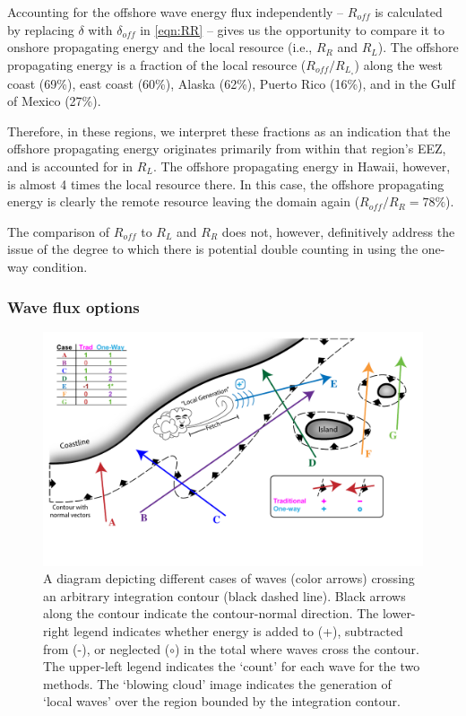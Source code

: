 Accounting for the offshore wave energy flux independently -- $R_{off}$ is calculated by replacing $\delta$ with $\delta_{off}$ in \eqref{eqn:RR} -- gives us the opportunity to compare it to onshore propagating energy and the local resource (i.e., $R_R$ and $R_L$). The offshore propagating energy is a fraction of the local resource ($R_{off} / R_L_\circ$) along the west coast (69\%), east coast (60\%), Alaska (62\%), Puerto Rico (16\%), and in the Gulf of Mexico (27\%). 

Therefore, in these regions, we interpret these fractions as an indication that the offshore propagating energy originates primarily from within that region's EEZ, and is accounted for in $R_L$. 
The offshore propagating energy in Hawaii, however, is almost 4 times the local resource there. In this case, the offshore propagating energy is clearly the remote resource leaving the domain again ($R_{off} / R_R = 78\%$).

The comparison of $R_{off}$ to $R_L$ and $R_R$ does not, however, definitively address the issue of the degree to which there is potential double counting in using the one-way condition. 

\subsubsection{Wave flux options}

\begin{figure}[ht]
    \centering
    \includegraphics[width=\linewidth]{../diagram/Schematic03.pdf}
    \caption{A diagram depicting different cases of waves (color arrows) crossing an arbitrary integration contour (black dashed line). Black arrows along the contour indicate the contour-normal direction. The lower-right legend indicates whether energy is added to (+), subtracted from (-), or neglected ($\circ$) in the total where waves cross the contour. The upper-left legend indicates the `count' for each wave for the two methods. The `blowing cloud' image indicates the generation of `local waves' over the region bounded by the integration contour.}
    \label{fig:one-way-diagram}
\end{figure}

